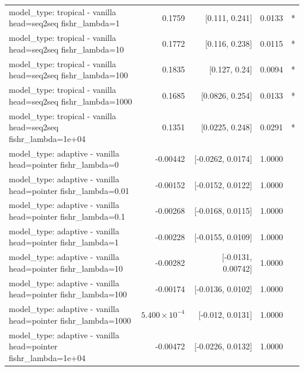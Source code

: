 \documentclass[10pt]{article}
\makeatletter
\newcommand{\stackcell}[1]{\begin{tabular}[t]{@{}l@{}}#1\end{tabular}}
\makeatother
\begin{document}
{\begin{longtable}{lrrrl}
\stackcell{model\_type: tropical - vanilla\\\footnotesize head=seq2seq fishr\_lambda=1 } & 0.1759 & [0.111, 0.241] & 0.0133 & *\\
\stackcell{model\_type: tropical - vanilla\\\footnotesize head=seq2seq fishr\_lambda=10 } & 0.1772 & [0.116, 0.238] & 0.0115 & *\\
\stackcell{model\_type: tropical - vanilla\\\footnotesize head=seq2seq fishr\_lambda=100 } & 0.1835 & [0.127, 0.24] & 0.0094 & *\\
\stackcell{model\_type: tropical - vanilla\\\footnotesize head=seq2seq fishr\_lambda=1000 } & 0.1685 & [0.0826, 0.254] & 0.0133 & *\\
\stackcell{model\_type: tropical - vanilla\\\footnotesize head=seq2seq fishr\_lambda=1e+04 } & 0.1351 & [0.0225, 0.248] & 0.0291 & *\\
\stackcell{model\_type: adaptive - vanilla\\\footnotesize head=pointer fishr\_lambda=0 } & -0.00442 & [-0.0262, 0.0174] & 1.0000 & \\
\stackcell{model\_type: adaptive - vanilla\\\footnotesize head=pointer fishr\_lambda=0.01 } & -0.00152 & [-0.0152, 0.0122] & 1.0000 & \\
\stackcell{model\_type: adaptive - vanilla\\\footnotesize head=pointer fishr\_lambda=0.1 } & -0.00268 & [-0.0168, 0.0115] & 1.0000 & \\
\stackcell{model\_type: adaptive - vanilla\\\footnotesize head=pointer fishr\_lambda=1 } & -0.00228 & [-0.0155, 0.0109] & 1.0000 & \\
\stackcell{model\_type: adaptive - vanilla\\\footnotesize head=pointer fishr\_lambda=10 } & -0.00282 & [-0.0131, 0.00742] & 1.0000 & \\
\stackcell{model\_type: adaptive - vanilla\\\footnotesize head=pointer fishr\_lambda=100 } & -0.00174 & [-0.0136, 0.0102] & 1.0000 & \\
\stackcell{model\_type: adaptive - vanilla\\\footnotesize head=pointer fishr\_lambda=1000 } & $5.400\times10^{-4}$ & [-0.012, 0.0131] & 1.0000 & \\
\stackcell{model\_type: adaptive - vanilla\\\footnotesize head=pointer fishr\_lambda=1e+04 } & -0.00472 & [-0.0226, 0.0132] & 1.0000 & \\

\end{longtable}}
\end{document}
